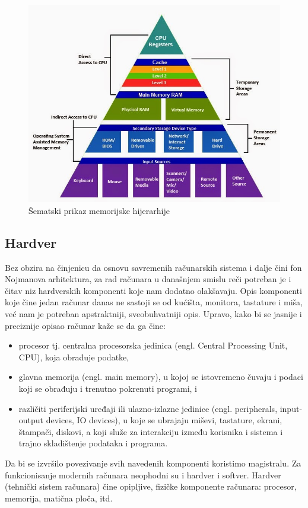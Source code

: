 \documentclass[a4paper]{article}
\begin{document}
\begin{figure}[h!]
\begin{center}
\includegraphics[scale=0.25]{pictures/mem_hijer.jpg}
\end{center}
\caption{Šematski prikaz memorijske hijerarhije}
\label{fig:memh}
\end{figure}

\subsection{Hardver}
Bez obzira na činjenicu da osnovu savremenih računarskih sistema i dalje čini fon Nojmanova arhitektura, za rad računara u današnjem smislu reči potreban je i čitav niz hardverskih komponenti koje nam dodatno olakšavaju. Opis komponenti koje čine jedan računar danas ne sastoji se od kućišta, monitora, tastature i miša, već nam je potreban apstraktniji, sveobuhvatniji opis. Upravo, kako bi se jasnije i preciznije opisao računar kaže se da ga čine:
\begin{itemize}
\item procesor tj. centralna procesorska jedinica (engl. Central Processing Unit,
CPU), koja obrađuje podatke,
\item glavna memorija (engl. main memory), u kojoj se istovremeno čuvaju i
podaci koji se obrađuju i trenutno pokrenuti programi, i 
\item različiti periferijski uređaji ili ulazno-izlazne jedinice (engl. peripherals,
input-output devices, IO devices), u koje se ubrajaju miševi, tastature, ekrani,
štampači, diskovi, a koji služe za interakciju između korisnika i sistema i trajno skladištenje podataka i programa.
\end{itemize} 
Da bi se izvršilo povezivanje svih navedenih komponenti koristimo magistralu.
Za funkcionisanje modernih računara neophodni su i hardver i softver. 
Hardver (tehnički sistem računara) čine opipljive, fizičke komponente računara: procesor, memorija, matična ploča, itd. 
\end{document}
